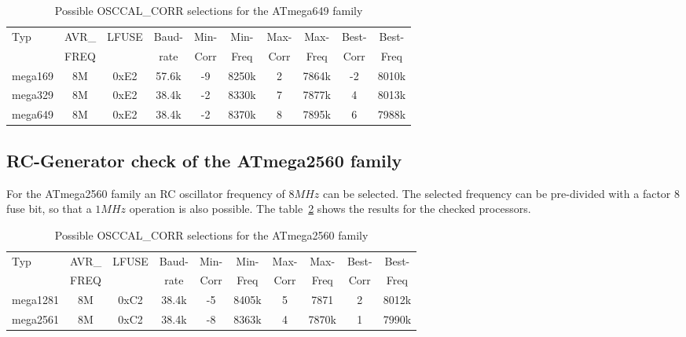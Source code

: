\begin{table}[H]
  \begin{center}
    \begin{tabular}{| l | c | c | c || c | c || c | c || c | c |}
    \hline
   Typ  &       AVR\_ & LFUSE & Baud- & Min- & Min- & Max- & Max- & Best- & Best-  \\
        &       FREQ  &       & rate & Corr & Freq & Corr & Freq  & Corr  & Freq  \\
    \hline
    \hline
mega169 &          8M & 0xE2  & 57.6k &  -9  & 8250k & 2  & 7864k  & -2  & 8010k \\
    \hline
mega329 &          8M & 0xE2  & 38.4k &  -2  & 8330k & 7  & 7877k  &  4  & 8013k \\
    \hline
mega649 &          8M & 0xE2  & 38.4k &  -2  & 8370k & 8  & 7895k  &  6  & 7988k \\
    \hline
    \end{tabular}
  \end{center}
  \caption{Possible OSCCAL\_CORR selections for the ATmega649 family}
  \label{tab:mega649freq}
\end{table}

\subsection{RC-Generator check of the ATmega2560 family}

For the ATmega2560 family an RC oscillator frequency of \(8MHz\) can be selected.
The selected frequency can be pre-divided with a factor 8 fuse bit,
so that a \(1MHz\) operation is also possible.
The table~\ref{tab:mega2560freq} shows the results for the checked processors.

\begin{table}[H]
  \begin{center}
    \begin{tabular}{| l | c | c | c || c | c || c | c || c | c |}
    \hline
   Typ  &       AVR\_ & LFUSE & Baud- & Min- & Min- & Max- & Max- & Best- & Best-  \\
        &       FREQ  &       & rate & Corr & Freq & Corr & Freq  & Corr  & Freq  \\
    \hline
    \hline
mega1281 &          8M & 0xC2  & 38.4k &  -5 & 8405k & 5 & 7871   & 2  &  8012k \\
    \hline
mega2561 &          8M & 0xC2  & 38.4k &  -8 & 8363k & 4  & 7870k  & 1  & 7990k \\
    \hline
    \end{tabular}
  \end{center}
  \caption{Possible OSCCAL\_CORR selections for the ATmega2560 family}
  \label{tab:mega2560freq}
\end{table}

